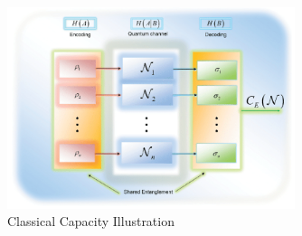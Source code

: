 \begin{figure}[h]
    \centering
    \includegraphics[width=0.75\textwidth]{figures/classical_cap.png}
    \caption{Classical Capacity Illustration \cite{6773024}}
\end{figure}
